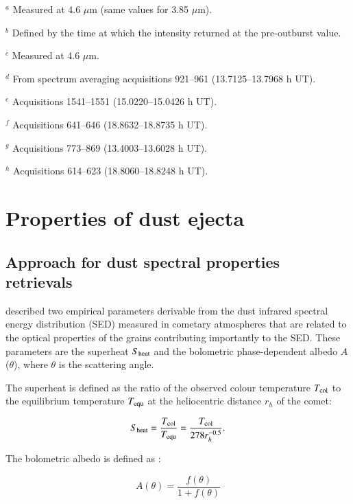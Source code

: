 \documentclass[a4paper,fleqn,usenatbib]{mnras}
\begin{document}
\begin{table*}
{\raggedright
    $^a$ Measured at 4.6 $\mu$m (same values for 3.85 $\mu$m).

    $^b$ Defined by the time at which the intensity returned at the pre-outburst value.

    $^c$ Measured at 4.6 $\mu$m.

    $^d$ From spectrum averaging acquisitions 921--961 (13.7125--13.7968 h UT).

    $^e$ Acquisitions 1541--1551 (15.0220--15.0426 h UT).

    $^f$ Acquisitions 641--646 (18.8632--18.8735 h UT).

    $^g$ Acquisitions 773--869 (13.4003--13.6028 h UT).

    $^h$ Acquisitions 614--623 (18.8060--18.8248 h UT).

    }
\end{table*}

\section{Properties of dust ejecta}
\label{sec:prop}

\subsection{Approach for dust spectral properties retrievals}
\label{sec:approach}

\citet{Gehrz1992} described two empirical parameters derivable from the dust infrared spectral energy distribution (SED) measured in cometary atmospheres that are related to the optical properties of the grains contributing
importantly to the SED. These parameters are the superheat $S_{\rm heat}$ and the bolometric phase-dependent albedo $A$($\theta$), where $\theta$ is the scattering angle.

The superheat is defined as the ratio of the observed colour temperature $T_{\rm col}$ to the equilibrium temperature $T_{\rm equ}$ at the heliocentric distance $r_h$ of the comet:

\begin{equation}\label{eq:1}
S_{\rm heat} = \frac{T_{\rm col}}{T_{\rm equ}} = \frac{T_{\rm col}}{278 r_h^{-0.5}}.
\end{equation}

The bolometric albedo is defined as :

\begin{equation}\label{eq:2}
A(\theta) = \frac{f(\theta)}{1+f(\theta)}
\end{equation}
\end{document}
